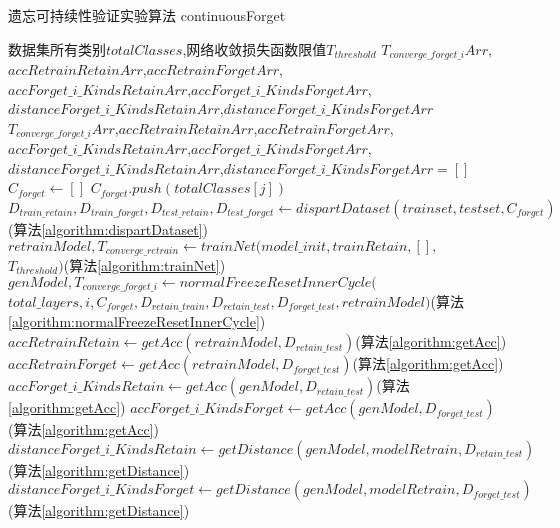 \begin{algorithm}
	\renewcommand{\algorithmicrequire}{\textbf{Input:}}
	\renewcommand{\algorithmicensure}{\textbf{Output:}}
	\caption{遗忘可持续性验证实验算法 continuousForget}
	\label{algorithm:continuousForget}
	\begin{algorithmic}[1]
        \REQUIRE 数据集所有类别$totalClasses$,网络收敛损失函数限值$T_{threshold}$
        \ENSURE  $T_{converge\_forget\_i}Arr$,$accRetrainRetainArr$,$accRetrainForgetArr$,\\$accForget\_i\_KindsRetainArr$,$accForget\_i\_KindsForgetArr$,\\$distanceForget\_i\_KindsRetainArr$,$distanceForget\_i\_KindsForgetArr$
        \STATE $T_{converge\_forget\_i}Arr$,$accRetrainRetainArr$,$accRetrainForgetArr$,\\$accForget\_i\_KindsRetainArr$,$accForget\_i\_KindsForgetArr$,\\$distanceForget\_i\_KindsRetainArr$,$distanceForget\_i\_KindsForgetArr$$ = []$
            \STATE $C_{forget} \gets []$
                \STATE $C_{forget}.push(totalClasses[j])$
            \ENDFOR
            \STATE $D_{train\_retain},D_{train\_forget},D_{test\_retain},D_{test\_forget} \gets dispartDataset(trainset, testset, C_{forget})$(算法\ref{algorithm:dispartDataset})
            \STATE $retrainModel,T_{converge\_retrain} \gets trainNet(model\_init, trainRetain, [],$ \\ $ T_{threshold})$(算法\ref{algorithm:trainNet})
            \STATE $genModel, T_{converge\_forget\_i} \gets normalFreezeResetInnerCycle($\\$total\_layers, i, C_{forget},D_{retain\_train},D_{retain\_test}, D_{forget\_test},retrainModel )$(算法\ref{algorithm:normalFreezeResetInnerCycle})
            \STATE $accRetrainRetain \gets getAcc(retrainModel, D_{retain\_test})$(算法\ref{algorithm:getAcc})
            \STATE $accRetrainForget  \gets getAcc(retrainModel, D_{forget\_test})$(算法\ref{algorithm:getAcc})
            \STATE $accForget\_i\_KindsRetain \gets getAcc(genModel, D_{retain\_test})$(算法\ref{algorithm:getAcc})
            \STATE $accForget\_i\_KindsForget  \gets getAcc(genModel, D_{forget\_test})$(算法\ref{algorithm:getAcc})
            \STATE $distanceForget\_i\_KindsRetain \gets getDistance(genModel, modelRetrain,D_{retain\_test})$(算法\ref{algorithm:getDistance})
            \STATE $distanceForget\_i\_KindsForget \gets getDistance(genModel, modelRetrain, D_{forget\_test})$(算法\ref{algorithm:getDistance})
$$
\end{algorithmic}
\end{algorithm}
